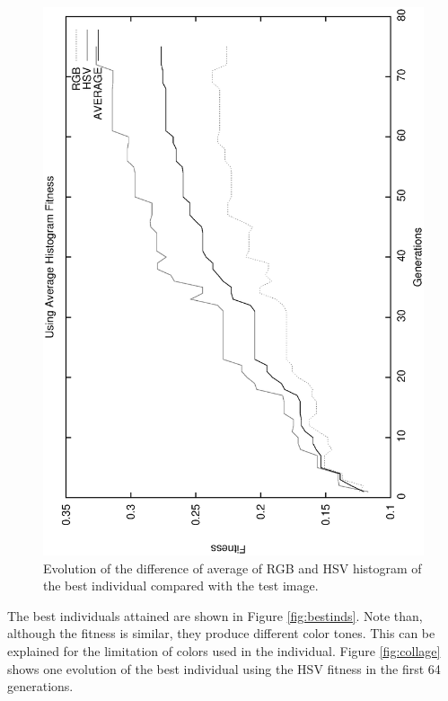\documentclass[conference]{IEEEtran}
\begin{document}
\begin{figure}
   \includegraphics[angle=-90,scale =0.35] {images/averagegens.eps}
\caption{Evolution of the difference of average of RGB and HSV histogram of the best individual compared with the test image. }
\label{fig:averagegens}
\end{figure}

The best individuals attained are shown in Figure \ref{fig:bestinds}. Note than, although the fitness is similar, they produce different color tones. This can be explained for the limitation of colors used in the individual. Figure \ref{fig:collage} shows one evolution of the best individual using the HSV fitness in the first 64 generations.
\end{document}
